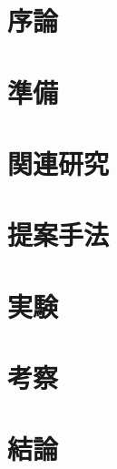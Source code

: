 \documentclass[12pt,uplatex]{jsarticle}   %
\begin{document}
\section{序論}


\section{準備}


\section{関連研究}


\section{提案手法}


\section{実験}


\section{考察}


\section{結論}


\acknowledgements




\appendix

\end{document}
